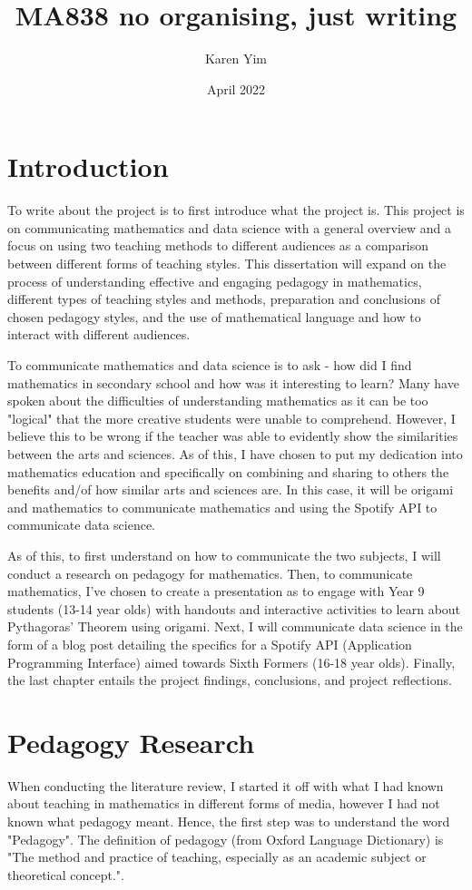 \documentclass{article}
\title{MA838 no organising, just writing}
\author{Karen Yim}
\date{April 2022}
\begin{document}
\maketitle

\section{Introduction}
To write about the project is to first introduce what the project is. This project is on communicating mathematics and data science with a general overview and a focus on using two teaching methods to different audiences as a comparison between different forms of teaching styles. This dissertation will expand on the process of understanding effective and engaging pedagogy in mathematics, different types of teaching styles and methods, preparation and conclusions of chosen pedagogy styles, and the use of mathematical language and how to interact with different audiences.

To communicate mathematics and data science is to ask - how did I find mathematics in secondary school and how was it interesting to learn? Many have spoken about the difficulties of understanding mathematics as it can be too "logical" that the more creative students were unable to comprehend. However, I believe this to be {\color{red}wrong} if the teacher was able to evidently show the similarities between the arts and sciences. As of this, I have chosen to put my dedication into mathematics education and specifically on combining and sharing to others the benefits and/of how similar arts and sciences are. In this case, it will be origami and mathematics to communicate mathematics and using the Spotify API to communicate data science.

As of this, to first understand on how to communicate the two subjects, I will conduct a research on pedagogy for mathematics. Then, to communicate mathematics, I've chosen to create a presentation as to engage with Year 9 students (13-14 year olds) with handouts and interactive activities to learn about Pythagoras' Theorem using origami. Next, I will communicate data science in the form of a blog post detailing the specifics for a Spotify API (Application Programming Interface) aimed towards Sixth Formers (16-18 year olds). Finally, the last chapter entails the project findings, conclusions, and project reflections.

\section{Pedagogy Research}
When conducting the literature review, I started it off with what I had known about teaching in mathematics in different forms of media, however I had not known what pedagogy meant. Hence, the first step was to understand the word "Pedagogy".
The definition of pedagogy (from Oxford Language Dictionary) is "The method and practice of teaching, especially as an academic subject or theoretical concept.".
\end{document}
